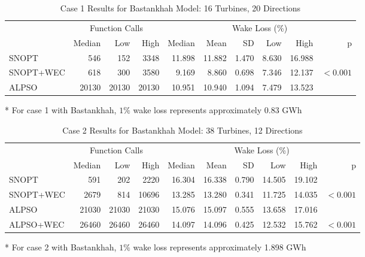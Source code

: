 \documentclass{jpconf}
\begin{document}
\begin{table}
	\centering
	\caption{Case 1 Results for Bastankhah Model: 16 Turbines, 20 Directions}
	\label{tab:case1}
	\begin{threeparttable}
	\begin{tabular}{lrrrrrrrrr}
		\toprule
		{} & \multicolumn{3}{c}{Function Calls} & \multicolumn{6}{c}{Wake Loss (\%)\tnote{*}} \\
		\cmidrule(lr){2-4} \cmidrule(lr){5-10}
		{} &         Median &    Low &   High &        Median &   Mean &    SD &   Low &   High &          p \\
		\cmidrule(lr){2-4} \cmidrule(lr){5-10}
		SNOPT     &            546 &    152 &   3348 &        11.898 & 11.882 & 1.470 & 8.630 & 16.988 &            \\
		SNOPT+WEC &            618 &    300 &   3580 &         9.169 &  8.860 & 0.698 & 7.346 & 12.137 &  $< 0.001$ \\
		ALPSO     &          20130 &  20130 &  20130 &        10.951 & 10.940 & 1.094 & 7.479 & 13.523 &            \\
		\bottomrule
	\end{tabular}
	\begin{tablenotes}
		\item[*]For case 1 with Bastankhah, $1\%$ wake loss represents approximately 0.83 GWh
	\end{tablenotes}	
	\end{threeparttable}
\end{table}
\begin{table}
	\centering
	\caption{Case 2 Results for Bastankhah Model: 38 Turbines, 12 Directions}
	\label{tab:case2}
	\begin{threeparttable}
	\begin{tabular}{lrrrrrrrrr}
		\toprule
		{} & \multicolumn{3}{c}{Function Calls} & \multicolumn{6}{c}{Wake Loss (\%)\tnote{*}} \\
		\cmidrule(lr){2-4} \cmidrule(lr){5-10}
		{} &         Median &    Low &   High &        Median &   Mean &    SD &    Low &   High &          p \\
		\cmidrule(lr){2-4} \cmidrule(lr){5-10}
		SNOPT     &            591 &    202 &   2220 &        16.304 & 16.338 & 0.790 & 14.505 & 19.102 &            \\
		SNOPT+WEC &           2679 &    814 &  10696 &        13.285 & 13.280 & 0.341 & 11.725 & 14.035 &  $< 0.001$ \\
		ALPSO     &          21030 &  21030 &  21030 &        15.076 & 15.097 & 0.555 & 13.658 & 17.016 &            \\
		ALPSO+WEC &          26460 &  26460 &  26460 &        14.097 & 14.096 & 0.425 & 12.532 & 15.762 &  $< 0.001$ \\
		\bottomrule
	\end{tabular}
	\begin{tablenotes}
	\item[*] For case 2 with Bastankhah, $1\%$ wake loss represents approximately 1.898 GWh
	\end{tablenotes}		
	\end{threeparttable}
\end{table}
\end{document}
